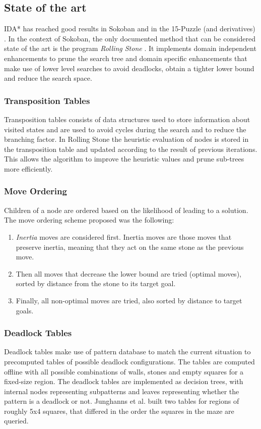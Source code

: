 \subsection{State of the art}\label{sokobanoptimizations}
IDA* has reached good results in Sokoban \cite{Junghanns99pushingthe} and in the 15-Puzzle (and derivatives) \cite{DBLP:conf/aaai/KorfT96}. 
In the context of Sokoban, the only documented method that can be considered state of the art is the program \textit{Rolling Stone} \cite{Junghanns99pushingthe}. It implements domain independent enhancements \cite{DBLP:journals/pami/ReinefeldM94} to prune the search tree and domain specific enhancements that make use of lower level searches to avoid deadlocks, obtain a tighter lower bound and reduce the search space.

\subsubsection*{Transposition Tables}
Transposition tables consists of data structures used to store information about visited states and are used to avoid cycles during the search and to reduce the branching factor. In Rolling Stone the heuristic evaluation of nodes is stored in the transposition table and updated according to the result of previous iterations. This allows the algorithm to improve the heuristic values and prune sub-trees more efficiently.

\subsubsection*{Move Ordering}
Children of a node are ordered based on the likelihood of leading to a solution. The move ordering scheme proposed was the following:
\begin{enumerate}
    \item \textit{Inertia} moves are considered first. Inertia moves are those moves that preserve inertia, meaning that they act on the same stone as the previous move.
    \item Then all moves that decrease the lower bound are tried (optimal moves), sorted by distance from the stone to its target goal.
    \item Finally, all non-optimal moves are tried, also sorted by distance to target goals.
\end{enumerate}

\subsubsection*{Deadlock Tables}
Deadlock tables make use of pattern database \cite{10.1007/3-540-61291-2_68} to match the current situation to precomputed tables of possible deadlock configurations. The tables are computed offline with all possible combinations of walls, stones and empty squares for a fixed-size region. The deadlock tables are implemented as decision trees, with internal nodes representing subpatterns and leaves representing whether the pattern is a deadlock or not. Junghanns et al. \cite{Junghanns99pushingthe} built two tables for regions of roughly 5x4 squares, that differed in the order the squares in the maze are queried.

